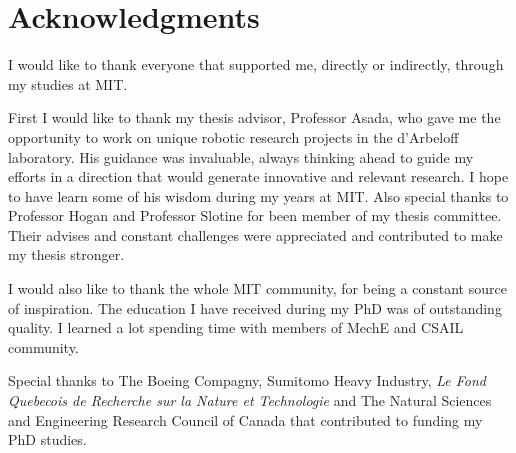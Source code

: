\section*{Acknowledgments}

I would like to thank everyone that supported me, directly or indirectly, through my studies at MIT. 

First I would like to thank my thesis advisor, Professor Asada, who gave me the opportunity to work on unique robotic research projects in the d'Arbeloff laboratory. His guidance was invaluable, always thinking ahead to guide my efforts in a direction that would generate innovative and relevant research. I hope to have learn some of his wisdom during my years at MIT. Also special thanks to Professor Hogan and Professor Slotine for been member of my thesis committee. Their advises and constant challenges were appreciated and contributed to make my thesis stronger.

I would also like to thank the whole MIT community, for being a constant source of inspiration. The education I have received during my PhD was of outstanding quality. I learned a lot spending time with members of MechE and CSAIL community.

Special thanks to The Boeing Compagny, Sumitomo Heavy Industry, \textit{Le Fond Quebecois de Recherche sur la Nature et Technologie} and The Natural Sciences and Engineering Research Council of Canada that contributed to funding my PhD studies.








